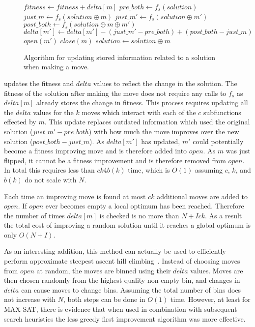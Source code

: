 \begin{figure}
  \begin{algorithmic}[1]
    \State $fitness \leftarrow fitness + delta[m]$
      \State $pre\_both \leftarrow f_s(solution)$
      \State $just\_m \leftarrow f_s(solution \oplus m)$
        \State $just\_m' \leftarrow f_s(solution \oplus m')$
        \State $post\_both \leftarrow f_s(solution \oplus m \oplus m')$
        \State $delta[m'] \leftarrow delta[m'] - (just\_m' - pre\_both) + (post\_both - just\_m)$
        \State $open(m')$
      \EndFor
    \EndFor
    \State $close(m)$
    \State $solution \leftarrow solution \oplus m$
  \EndProcedure
\end{algorithmic}
  \caption{Algorithm for updating stored information related to a solution when
           making a move.}
  \label{fig-make-move}
\end{figure}

 updates the fitness and $delta$ values to reflect the change in the solution. The fitness
of the solution after making the move does not require any calls to $f_s$ as $delta[m]$ already stores the
change in fitness. This process requires updating all the $delta$ values for the $k$ moves which interact with each of the $c$ subfunctions
effected by $m$. This update replaces outdated information which used the original solution ($just\_m' - pre\_both$)
with how much the move improves over the new solution ($post\_both - just\_m$). As $delta[m']$ has updated, $m'$ could
potentially become a fitness improving move and is therefore added into $open$. As $m$ was just flipped,
it cannot be a fitness improvement and is therefore removed from $open$.  In total this requires less than
$ck4b(k)$ time, which is $O(1)$ assuming $c$, $k$, and $b(k)$ do not scale with $N$.

Each time an improving move is found at most $ck$ additional moves are added to $open$. If $open$ ever
becomes empty a local optimum has been reached. Therefore the number of times $delta[m]$ is checked
is no more than $N + Ick$. As a result the total cost of improving a random solution until it reaches
a global optimum is only $O(N+I)$.

As an interesting addition, this method can actually be used to efficiently perform approximate steepest ascent hill
climbing~\cite{whitley:2013:greedy}. Instead of choosing moves from $open$ at random, the moves are binned
using their $delta$ values. Moves are then chosen randomly from the highest quality non-empty bin, and changes
in $delta$ can cause moves to change bins. Assuming the total number of bins does not increase with $N$, both steps
can be done in $O(1)$ time. However, at least for MAX-SAT, there is evidence that when used in combination with subsequent
search heuristics the less greedy first improvement algorithm was more effective.

